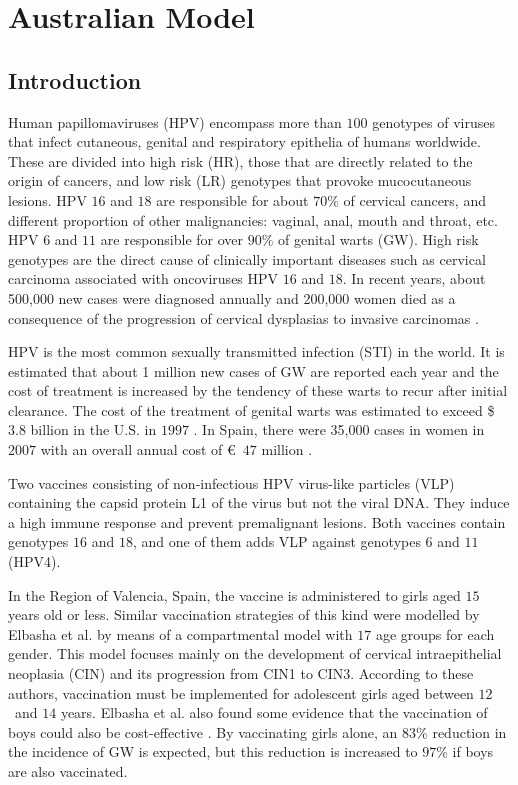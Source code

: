 
\chapter{Australian Model}\label{introAustralia}

\section{Introduction}
Human papillomaviruses (HPV) encompass more than $100$ genotypes of viruses that infect cutaneous, genital and respiratory epithelia of humans worldwide. These are divided into high risk (HR), those that are directly related to the origin of cancers, and low risk (LR) genotypes that provoke mucocutaneous lesions. HPV $16$ and $18$ are responsible for about $70\%$ of cervical cancers, and different proportion of other malignancies: vaginal, anal, mouth and throat, etc.
HPV $6$ and $11$ are responsible for over $90\%$ of genital warts (GW). High risk genotypes are the direct cause of clinically important diseases such as cervical carcinoma associated with oncoviruses HPV $16$ and $18$. In recent years, about 500,000 new cases were diagnosed annually and 200,000 women died as a consequence of the progression of cervical dysplasias to invasive carcinomas \cite{Pathology}.

HPV is the most common sexually transmitted infection (STI) in the world. It is estimated that about 1 million new cases of GW are reported each year and the cost of treatment is increased by the tendency of these warts to recur after initial clearance. The cost of the treatment of genital warts was estimated to exceed \$ $3.8$ billion in the U.S. in $1997$ \cite{Roberts}. In Spain, there were 35,000 cases in women in $2007$ with an overall annual cost of \euro \ $47$ million \cite{CLEOPATRE}.

Two vaccines consisting of non-infectious HPV virus-like particles (VLP) \cite{McNeil} containing the capsid protein L1 of the virus but not the viral DNA. They induce a high immune response and prevent premalignant lesions. Both vaccines contain genotypes $16$ and $18$, and one of them adds VLP against genotypes $6$ and $11$ (HPV4).

In the Region of Valencia, Spain, the vaccine is administered to girls aged $15$ years old or less. Similar vaccination strategies of this kind were modelled by Elbasha et al. \cite{Elbasha1,Elbasha2} by means of a compartmental model with $17$ age groups for each gender. This model focuses mainly on the development of cervical intraepithelial neoplasia (CIN) and its progression from CIN1 to CIN3. According to these authors, vaccination must be implemented for adolescent girls aged between $12$~and $14$ years. Elbasha et al. also found some evidence that the vaccination of boys could also be cost-effective \cite{Elbasha1}. By vaccinating girls alone, an $83\%$ reduction in the incidence of GW is expected, but this reduction is increased to $97\%$ if boys are also vaccinated.

